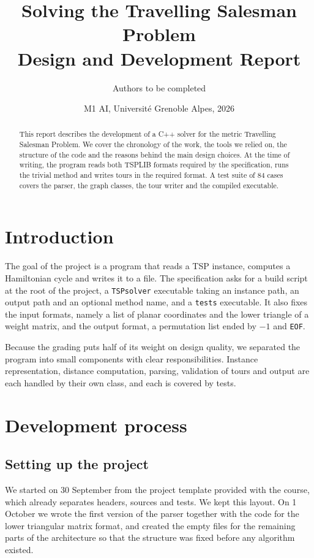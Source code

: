 \documentclass[11pt,a4paper]{article}
\title{Solving the Travelling Salesman Problem\\[0.3em]\large Design and Development Report}
\author{Authors to be completed}
\date{M1 AI, Universit\'e Grenoble Alpes, 2026}
\begin{document}
\maketitle

\begin{abstract}
\noindent
This report describes the development of a C++ solver for the metric Travelling Salesman Problem. We cover the chronology of the work, the tools we relied on, the structure of the code and the reasons behind the main design choices. At the time of writing, the program reads both TSPLIB formats required by the specification, runs the trivial method and writes tours in the required format. A test suite of 84 cases covers the parser, the graph classes, the tour writer and the compiled executable.
\end{abstract}

\section{Introduction}

The goal of the project is a program that reads a TSP instance, computes a Hamiltonian cycle and writes it to a file. The specification asks for a build script at the root of the project, a \texttt{TSPsolver} executable taking an instance path, an output path and an optional method name, and a \texttt{tests} executable. It also fixes the input formats, namely a list of planar coordinates and the lower triangle of a weight matrix, and the output format, a permutation list ended by $-1$ and \texttt{EOF}.

Because the grading puts half of its weight on design quality, we separated the program into small components with clear responsibilities. Instance representation, distance computation, parsing, validation of tours and output are each handled by their own class, and each is covered by tests.

\section{Development process}\label{sec-process}

\subsection{Setting up the project}

We started on 30 September from the project template provided with the course, which already separates headers, sources and tests. We kept this layout. On 1 October we wrote the first version of the parser together with the code for the lower triangular matrix format, and created the empty files for the remaining parts of the architecture so that the structure was fixed before any algorithm existed.
\end{document}
